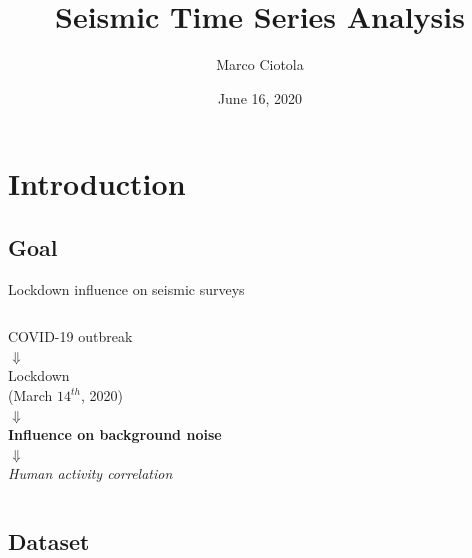 \documentclass{beamer}
\title[Seismic Time Series Analysis]{Seismic Time Series Analysis} %
\author{Marco Ciotola} %
\institute[Ca' Foscari] %
{
	Ca' Foscari University\\ %
	\medskip
	\textit{848222@stud.unive.it} %
}
\date{June 16, 2020} %
\begin{document}
	

\begin{frame}
	\titlepage %
\end{frame}


\section{Introduction} %
\subsection{Goal}
\begin{frame}{Lockdown influence on seismic surveys}
	\begin{columns}[c]
		\centering\large COVID-19 outbreak\\
		\vspace{.5em}\centering\large$\Downarrow$\vspace{.5em}\\
		\centering\large Lockdown\\\small(March $14^{th}$, 2020) \\
		\vspace{.5em}\centering\large$\Downarrow$\vspace{.5em}\\
		\centering\large \textbf{Influence on background noise}\\
		\vspace{.5em}\centering\large$\Downarrow$\vspace{.5em}\\
		\centering\large \textit{Human activity correlation} \\
	\end{columns}
\end{frame}

\subsection{Dataset}
\end{document}
